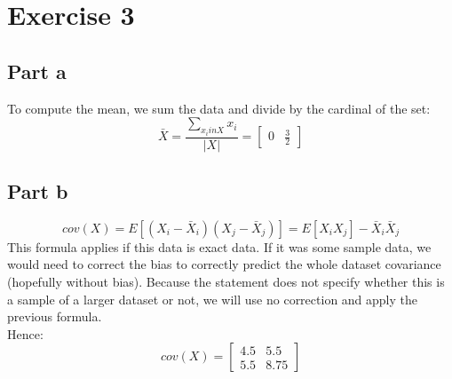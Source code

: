 \documentclass[a4paper, 10pt]{article}
\begin{document}
\section{Exercise 3}
\subsection{Part a}
To compute the mean, we sum the data and divide by the cardinal of the set:
$$
\bar{X} = \frac{\sum_{x_i in X}x_i}{\left\vert X\right\vert} = 
\begin{bmatrix}
    0 & \frac{3}{2}
\end{bmatrix}
$$

\subsection{Part b}
$$
cov(X) = E\left[(X_i - \bar X_i)(X_j - \bar X_j)\right] = E\left[X_iX_j\right] - \bar X_i\bar X_j
$$
This formula applies if this data is exact data. If it was some sample data, we would need to correct the 
bias to correctly predict the whole dataset covariance (hopefully without bias).
Because the statement does not specify whether this is a sample of a larger dataset or not,
we will use no correction and apply the previous formula.
\\
Hence:
$$
cov(X) = \begin{bmatrix}
            4.5 & 5.5\\
            5.5 & 8.75
        \end{bmatrix}
$$
\end{document}
